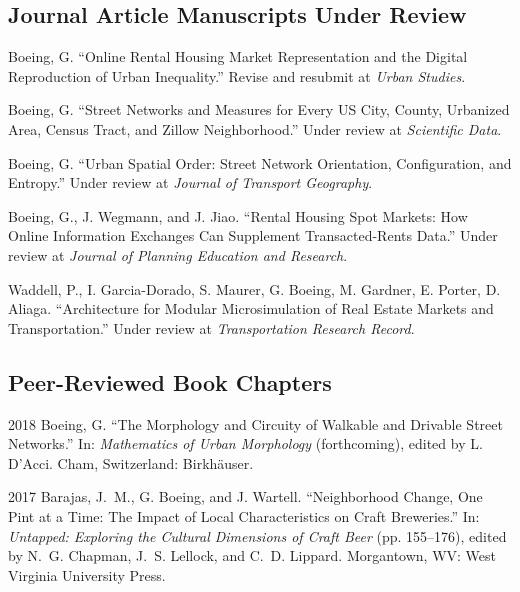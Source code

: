 \documentclass[12pt,letterpaper]{report}
\begin{document}
\subsection*{Journal Article Manuscripts Under Review}

\begin{tablist}

\item[\the\year] \tab Boeing, G. \enquote{Online Rental Housing Market Representation and the Digital Reproduction of Urban Inequality.} Revise and resubmit at \textit{Urban Studies}.

\item[\the\year] \tab Boeing, G. \enquote{Street Networks and Measures for Every US City, County, Urbanized Area, Census Tract, and Zillow Neighborhood.} Under review at \textit{Scientific Data}.

\item[\the\year] \tab Boeing, G. \enquote{Urban Spatial Order: Street Network Orientation, Configuration, and Entropy.} Under review at \textit{Journal of Transport Geography}.

\item[\the\year] \tab Boeing, G., J. Wegmann, and J. Jiao. \enquote{Rental Housing Spot Markets: How Online Information Exchanges Can Supplement Transacted-Rents Data.} Under review at \textit{Journal of Planning Education and Research}.

\item[\the\year] \tab Waddell, P., I. Garcia-Dorado, S. Maurer, G. Boeing, M. Gardner, E. Porter, D. Aliaga. \enquote{Architecture for Modular Microsimulation of Real Estate Markets and Transportation.} Under review at \textit{Transportation Research Record}.

\end{tablist}



\subsection*{Peer-Reviewed Book Chapters}

\begin{tablist}

\item[2018] \tab Boeing, G. \enquote{The Morphology and Circuity of Walkable and Drivable Street Networks.} In: \textit{Mathematics of Urban Morphology} (forthcoming), edited by L. D'Acci. Cham, Switzerland: Birkhäuser.

\item[2017] \tab Barajas, J.~M., G. Boeing, and J. Wartell. \enquote{Neighborhood Change, One Pint at a Time: The Impact of Local Characteristics on Craft Breweries.} In: \textit{Untapped: Exploring the Cultural Dimensions of Craft Beer} (pp. 155--176), edited by N.~G. Chapman, J.~S. Lellock, and C.~D. Lippard. Morgantown, WV: West Virginia University Press.

\end{tablist}
\end{document}
